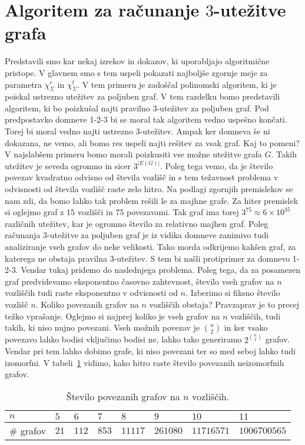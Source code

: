 \documentclass[12pt,a4paper,twoside]{article}
\theoremstyle{definition} %
\theoremstyle{plain} %
\newcommand{\ec}{\chi_{\Sigma}^e}
\newcommand{\ect}{\chi_{\Sigma}^t}
\numberwithin{equation}{section}  %
\begin{document}
\section{Algoritem za računanje $3$-utežitve grafa}
Predstavili smo kar nekaj izrekov in dokazov, ki uporabljajo algoritmične pristope. V glavnem smo s tem uspeli pokazati najboljše zgornje meje za parametra $\ec$ in $\ect$. V tem primeru je zadoščal polinomski algoritem, ki je poiskal ustrezno utežitev za poljuben graf. V tem razdelku bomo predstavili algoritem, ki bo poizkušal najti pravilno $3$-utežitev za poljuben graf. Pod predpostavko domneve 1-2-3 bi se moral tak algoritem vedno uspešno končati. Torej bi moral vedno najti ustrezno $3$-utežitev. Ampak ker domneva še ni dokazana, ne vemo, ali bomo res uspeli najti rešitev za vsak graf. Kaj to pomeni? V najslabšem primeru bomo morali poizkusiti vse možne utežitve grafa $G$. Takih utežitev je seveda ogromno in sicer $3^{|E(G)|}$. Poleg tega vemo, da je število povezav kvadratno odvisno od števila vozlišč in s tem težavnost problema v odvisnosti od števila vozlišč raste zelo hitro. Na podlagi zgornjih premislekov se nam zdi, da bomo lahko tak problem rešili le za majhne grafe. Za hiter premislek si oglejmo graf z $15$ vozlišči in $75$ povezavami. Tak graf ima torej $3^{75} \approx 6 \times 10^{35}$ različnih utežitev, kar je ogromno število za relativno majhen graf. Poleg računanja $3$-utežitve za poljuben graf je iz vidika domneve zanimivo tudi analiziranje vseh grafov do neke velikosti. Tako morda odkrijemo kakšen graf, za katerega ne obstaja pravilna $3$-utežitev. S tem bi našli protiprimer za domnevo 1-2-3. Vendar tukaj pridemo do naslednjega problema. Poleg tega, da za posamezen graf predvidevamo eksponentno časovno zahtevnost, število vseh grafov na $n$ vozliščih tudi raste eksponentno v odvisnosti od $n$. Izberimo si fiksno število vozlišč $n$. Koliko povezanih grafov na $n$ vozliščih obstaja? Pravzaprav je to precej težko vprašanje. Oglejmo si najprej koliko je vseh grafov na $n$ vozliščih, tudi takih, ki niso nujno povezani. Vseh možnih povezav je $ {n \choose 2}$ in ker vsako povezavo lahko bodisi vključimo bodisi ne, lahko tako generiramo $2^{n \choose 2}$ grafov. Vendar pri tem lahko dobimo grafe, ki niso povezani ter so med seboj lahko tudi izomorfni. V tabeli~\ref{tbl:gnumb} vidimo, kako hitro raste število povezanih neizomorfnih grafov.
\begin{table}[h!]


\begin{tabular}{|l|l|l|l|l|l|l|l|}

\hline
\multicolumn{1}{|l|}{$n$} & $5$  & $6$   & $7$ & $8$ & $9$ & $10$ & $11$ \\ \hline
\# grafov                 & $21$ & $112$ & $853$  & $11117$  & $261080$  & $11716571$   & $1006700565$  \\ \hline
\end{tabular}
\caption{Število povezanih grafov na $n$ vozliščih.}
\label{tbl:gnumb}
\end{table}
\end{document}

